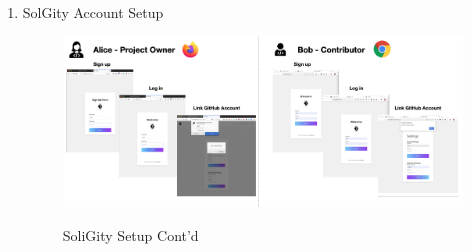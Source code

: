 \documentclass[12pt]{article}
\renewcommand{\_}{\kern-1.5pt\textunderscore\kern-1.5pt}
\begin{document}
\begin{enumerate}
   \item SolGity Account Setup
        \begin{figure}[H]
        	\centering
            \includegraphics[width=16.5cm]{graphs/49. setup_4.png}\\
        	\caption{SoliGity Setup Cont'd}
        	\label{fig:setup4}
        \end{figure}
 \end{enumerate}
\end{document}
